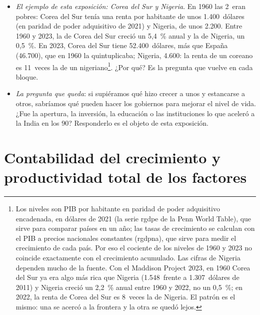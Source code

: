\documentclass[11pt]{article}
\begin{document}
\begin{anotaciones}
\begin{itemize}
\item \emph{El ejemplo de esta exposición: Corea del Sur y Nigeria}. En 1960 las 2~eran pobres: Corea del Sur tenía una renta por habitante de unos 1.400~dólares (en paridad de poder adquisitivo de 2021) y Nigeria, de unos 2.200. Entre 1960 y 2023, la de Corea del Sur creció un 5,4~\% anual y la de Nigeria, un 0,5~\%. En 2023, Corea del Sur tiene 52.400~dólares, más que España (46.700), que en 1960 la quintuplicaba; Nigeria, 4.600: la renta de un coreano es 11~veces la de un nigeriano\nocite{GGDC2025PWT}\footnote{Los niveles son PIB por habitante en paridad de poder adquisitivo encadenada, en dólares de 2021 (la serie rgdpe de la Penn World Table), que sirve para comparar países en un año; las tasas de crecimiento se calculan con el PIB a precios nacionales constantes (rgdpna), que sirve para medir el crecimiento de cada país. Por eso el cociente de los niveles de 1960 y 2023 no coincide exactamente con el crecimiento acumulado. Las cifras de Nigeria dependen mucho de la fuente. Con el Maddison Project 2023, en 1960 Corea del Sur ya era algo más rica que Nigeria (1.548~frente a 1.307~dólares de 2011) y Nigeria creció un 2,2~\% anual entre 1960 y 2022, no un 0,5~\%; en 2022, la renta de Corea del Sur es 8~veces la de Nigeria\nocite{BoltvanZanden2025}. El patrón es el mismo: una se acercó a la frontera y la otra se quedó lejos.}. ¿Por qué? Es la pregunta que vuelve en cada bloque.
\item \emph{La pregunta que queda}: si supiéramos qué hizo crecer a unos y estancarse a otros, sabríamos qué pueden hacer los gobiernos para mejorar el nivel de vida. ¿Fue la apertura, la inversión, la educación o las instituciones lo que aceleró a la India en los 90? Responderlo es el objeto de esta exposición.
\end{itemize}
\end{anotaciones}
\section{Contabilidad del crecimiento\cortetitulo{} y productividad total de los factores}\label{sec:contabilidad}
\end{document}
